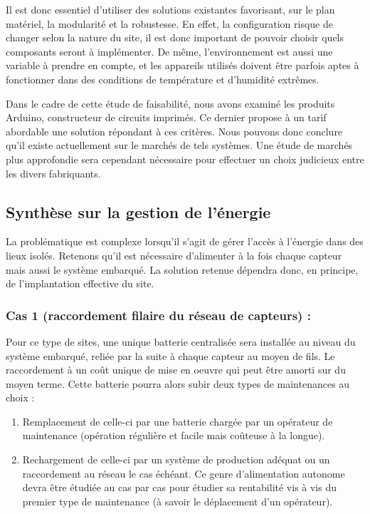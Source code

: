 \documentclass{mise_en_page}
\begin{document}
Il est donc essentiel d'utiliser des solutions
existantes favorisant, sur le plan matériel, la modularité et la
robustesse. En effet, la configuration risque de changer selon la
nature du site, il est donc important de pouvoir choisir quels
composants seront à implémenter. De même,
l'environnement est aussi une variable à prendre en
compte, et les appareils utilisés doivent être parfois aptes à
fonctionner dans des conditions de température et
d'humidité extrêmes.

Dans le cadre de cette étude de faisabilité, nous avons examiné les
produits Arduino, constructeur de circuits imprimés. Ce dernier propose
à un tarif abordable une solution répondant à ces critères. Nous
pouvons donc conclure qu'il existe actuellement sur le
marchés de tels systèmes. Une étude de marchés plus approfondie sera
cependant nécessaire pour effectuer un choix judicieux entre les divers
fabriquants.

\subsection{Synthèse sur la gestion de l’énergie}
La problématique est complexe lorsqu’il s’agit de gérer l’accès à
l’énergie dans des lieux isolés. Retenons qu’il est nécessaire
d’alimenter à la fois chaque capteur mais aussi le système embarqué. La
solution retenue dépendra donc, en principe, de l’implantation
effective du site.




\subsubsection{Cas 1 (raccordement filaire du réseau de capteurs) :}

Pour ce type de sites, une unique batterie centralisée sera installée au
niveau du système embarqué, reliée par la suite à chaque capteur au
moyen de fils. Le raccordement à un coût unique de mise en oeuvre qui
peut être amorti sur du moyen terme. Cette batterie pourra alors subir
deux types de maintenances au choix : 

\begin{enumerate}
\item Remplacement de celle-ci par une batterie chargée par un opérateur
de maintenance (opération régulière et facile mais coûteuse à la
longue).
\item Rechargement de celle-ci par un système de production adéquat ou
un raccordement au réseau le cas échéant. Ce genre d’alimentation
autonome devra être étudiée au cas par cas pour étudier sa rentabilité
vis à vis du premier type de maintenance (à savoir le déplacement d’un
opérateur).
\end{enumerate}
\end{document}
